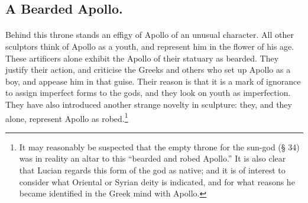 \documentclass[a4paper, 11pt, oneside, polutonikogreek, english]{article}
\begin{document}
\subsection{A Bearded Apollo.}
\paragraph{}
Behind this throne stands an effigy of Apollo of an unusual character. All other sculptors think of Apollo as a youth, and represent him in the flower of his age. These artificers alone exhibit the Apollo of their statuary as bearded. They justify their action, and criticise the Greeks and others who set up Apollo as a boy, and appease him in that guise. Their reason is that it is a mark of ignorance to assign imperfect forms to the gods, and they look on youth as imperfection. They have also introduced another strange novelty in sculpture: they, and they alone, represent Apollo as robed.\footnote{It may reasonably be suspected that the empty throne for the sun-god (§ 34) was in reality an altar to this ``bearded and robed Apollo.'' It is also clear that Lucian regards this form of the god as native; and it is of interest to consider what Oriental or Syrian deity is indicated, and for what reasons he became identified in the Greek mind with Apollo.  
}
\end{document}
